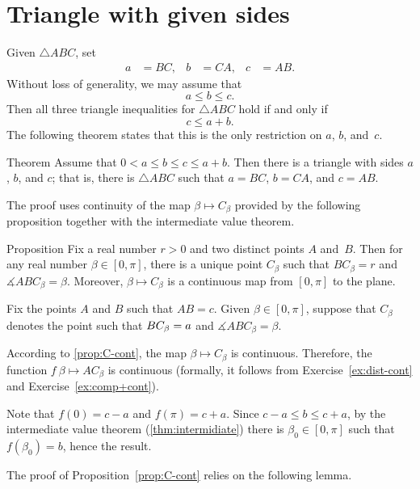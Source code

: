 \section{Triangle with given sides}

Given $\triangle ABC$, set 
\begin{align*}
a&=BC,
&
b&=CA,
&
c&=AB.
\end{align*}
Without loss of generality, we may assume that 
\[a\le b \le c.\]
Then all three triangle inequalities for $\triangle ABC$
hold if and only if 
\[c\le a+b.\]
The following theorem states that this is the only restriction on $a$, $b$, and~$c$.

\begin{thm}[\abs]{Theorem}\label{thm:abc}
Assume that $0<a\le b\le c\le a+b$.
Then there is a triangle with sides $a$, $b$, and $c$;
that is, there is $\triangle ABC$ 
such that $a=BC$, $b=CA$, and $c=AB$.
\end{thm}

The proof uses continuity of the map $\beta\mapsto C_\beta$ provided by the following proposition together with the intermediate value theorem.

\begin{thm}[\abs]{Proposition}\label{prop:C-cont}
Fix a real number $r>0$ 
and two distinct points $A$ and~$B$.
Then for 
any real number $\beta\in [0,\pi]$,
there is a unique point $C_\beta$ such that $BC_\beta=r$
and $\measuredangle ABC_\beta=\beta$.
Moreover, $\beta\mapsto C_\beta$ 
is a continuous map from $[0,\pi]$ to the plane.
\end{thm}

\label{page:proof:thm:abc}
Fix the points $A$ and $B$ such that $AB=c$.
Given $\beta\in [0,\pi]$,
suppose that $C_\beta$ denotes the point such that $BC_\beta\z=a$ and $\measuredangle ABC_\beta=\beta$.

According to \ref{prop:C-cont},
the map
$\beta\mapsto C_\beta$ is continuous.
Therefore, the function $f\:\beta\mapsto AC_\beta$ is continuous
(formally, it follows from Exercise~\ref{ex:dist-cont} and Exercise~\ref{ex:comp+cont}).

Note that $f(0)=c-a$ and $f(\pi)=c+a$.
Since $c-a\le b\le c+a$,
by the intermediate value theorem (\ref{thm:intermidiate})
there is $\beta_0\in[0,\pi]$ such that
$f(\beta_0)=b$,
hence the result. 
\qeds

The proof of Proposition~\ref{prop:C-cont} relies on the following lemma.


